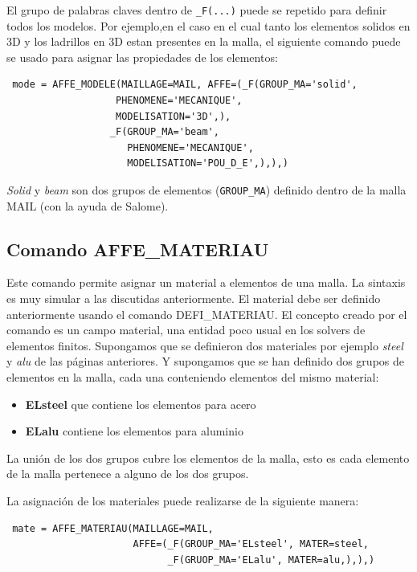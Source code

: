 \documentclass[12pt]{book}
\theoremstyle{definition}
\theoremstyle{remark}
\theoremstyle{plain}
\begin{document}
El grupo de palabras claves dentro de \verb*|_F(...)| puede se repetido para
definir todos los modelos. Por ejemplo,en el caso en el cual tanto los elementos 
solidos en 3D y los ladrillos en 3D estan presentes en la malla, el siguiente comando
puede se usado para asignar las propiedades de los elementos:

\begin{verbatim}
 mode = AFFE_MODELE(MAILLAGE=MAIL, AFFE=(_F(GROUP_MA='solid',
                   PHENOMENE='MECANIQUE',
                   MODELISATION='3D',),
                  _F(GROUP_MA='beam',
                     PHENOMENE='MECANIQUE',
                     MODELISATION='POU_D_E',),),)
\end{verbatim}
\textit{Solid} y \textit{beam} son dos grupos de elementos (\verb*|GROUP_MA|) definido 
dentro de la malla MAIL (con la ayuda de Salome).

\subsection{Comando AFFE\_MATERIAU}

Este comando permite asignar un material a elementos de una malla. La sintaxis es 
muy simular a las discutidas anteriormente. El material debe ser definido anteriormente
usando el comando DEFI\_MATERIAU. El concepto creado por el comando es un campo
material, una entidad poco usual en los solvers de elementos finitos. Supongamos 
que se definieron dos materiales por ejemplo \textit{steel} y \textit{alu} de las páginas
anteriores. Y supongamos que se han definido dos grupos de elementos en la malla, cada 
una conteniendo elementos del mismo material:

\begin{itemize}
 \item \textbf{ELsteel} que contiene los elementos para acero
 \item \textbf{ELalu} contiene los elementos para aluminio
\end{itemize}
La unión de los dos grupos cubre los elementos de la malla, esto es cada elemento
de la malla pertenece a alguno de los dos grupos.

La asignación de los materiales puede realizarse de la siguiente manera:

\begin{verbatim}
 mate = AFFE_MATERIAU(MAILLAGE=MAIL, 
                      AFFE=(_F(GROUP_MA='ELsteel', MATER=steel,
                            _F(GRUOP_MA='ELalu', MATER=alu,),),)
\end{verbatim}
\end{document}
